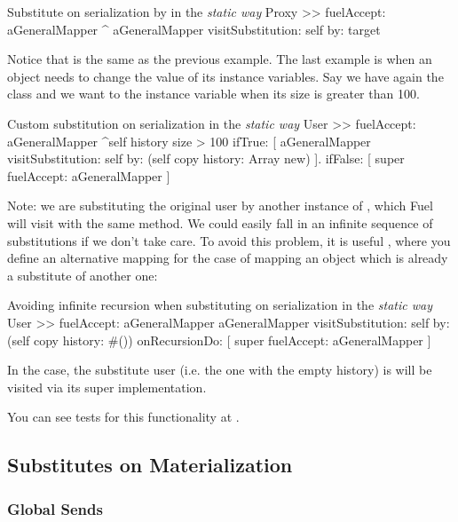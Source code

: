 \documentclass[a4paper,10pt,twoside]{book}
\begin{document}
\begin{code}{Substitute on serialization by  in the \emph{static way}}
Proxy >> fuelAccept: aGeneralMapper
    ^ aGeneralMapper visitSubstitution: self by: target
\end{code}

Notice that  is the same as the previous example. The last example is when an object needs to change the value of its instance variables. Say we have again the class  and we want to  the instance variable  when its size is greater than 100. 

\begin{code}{Custom substitution on serialization in the \emph{static way}}
User >> fuelAccept: aGeneralMapper
    ^self history size > 100 
        ifTrue: [ 
            aGeneralMapper 
                visitSubstitution: self 
                by: (self copy history: Array new) ].
        ifFalse: [ super fuelAccept: aGeneralMapper ]
\end{code}

Note: we are substituting the original user by another instance of , which Fuel will visit with the same  method. We could easily fall in an infinite sequence of substitutions if we don't take care. To avoid this problem, it is useful , where you define an alternative mapping for the case of mapping an object which is already a substitute of another one:

\begin{code}{Avoiding infinite recursion when substituting on serialization in the \emph{static way}}
User >> fuelAccept: aGeneralMapper
    aGeneralMapper 
        visitSubstitution: self 
        by: (self copy history: #())
        onRecursionDo: [ super fuelAccept: aGeneralMapper ]
\end{code}

In the case, the substitute user (i.e. the one with the empty history) is will be visited via its super implementation.

You can see tests for this functionality at .


\subsection{Substitutes on Materialization}


\subsubsection{Global Sends}
\end{document}

